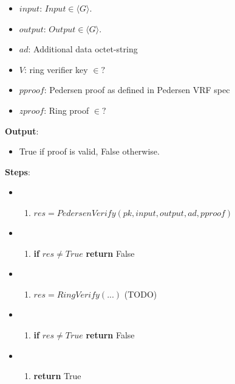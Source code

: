 \documentclass[
]{article}
\providecommand{\tightlist}{%
  \setlength{\itemsep}{0pt}\setlength{\parskip}{0pt}}
\begin{document}
\begin{itemize}
\tightlist
\item
  \(input\): \(Input \in \langle G \rangle\).
\item
  \(output\): \(Output \in \langle G \rangle\).
\item
  \(ad\): Additional data octet-string
\item
  \(V\): ring verifier key \(\in ?\)
\item
  \(pproof\): Pedersen proof as defined in Pedersen VRF spec
\item
  \(zproof\): Ring proof \(\in ?\)
\end{itemize}

\textbf{Output}:

\begin{itemize}
\tightlist
\item
  True if proof is valid, False otherwise.
\end{itemize}

\textbf{Steps}:

\begin{itemize}
\item
  \begin{enumerate}
  \def\labelenumi{\arabic{enumi}.}
  \tightlist
  \item
    \(res = PedersenVerify(pk, input, output, ad, pproof)\)
  \end{enumerate}
\item
  \begin{enumerate}
  \def\labelenumi{\arabic{enumi}.}
  \setcounter{enumi}{1}
  \tightlist
  \item
    \textbf{if} \(res \neq True\) \textbf{return} False
  \end{enumerate}
\item
  \begin{enumerate}
  \def\labelenumi{\arabic{enumi}.}
  \setcounter{enumi}{2}
  \tightlist
  \item
    \(res = RingVerify(...)\) (TODO)
  \end{enumerate}
\item
  \begin{enumerate}
  \def\labelenumi{\arabic{enumi}.}
  \setcounter{enumi}{3}
  \tightlist
  \item
    \textbf{if} \(res \neq True\) \textbf{return} False
  \end{enumerate}
\item
  \begin{enumerate}
  \def\labelenumi{\arabic{enumi}.}
  \setcounter{enumi}{3}
  \tightlist
  \item
    \textbf{return} True
  \end{enumerate}
\end{itemize}
\end{document}

